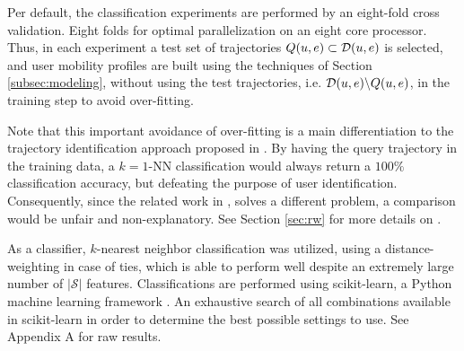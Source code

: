 Per default, the classification experiments are performed by an eight-fold cross validation. Eight folds for optimal parallelization on an eight core processor. Thus, in each experiment a test set of trajectories $Q(u,e) \subset \mathcal{D}(u,e)$ is selected, and user mobility profiles are built using the techniques of Section \ref{subsec:modeling}, without using the test trajectories, i.e. $\mathcal{D}(u,e) \backslash Q(u,e)$, in the training step to avoid over-fitting.

Note that this important avoidance of over-fitting is a main differentiation to the trajectory identification approach proposed in \citeauthor{DeMontjoye2013} \cite{DeMontjoye2013}. By having the query trajectory in the training data, a $k=1$-NN classification would always return a $100\%$ classification accuracy, but defeating the purpose of user identification. Consequently, since the related work in \citeauthor{DeMontjoye2013}, solves a different problem, a comparison would be unfair and non-explanatory. See Section \ref{sec:rw} for more details on \citeauthor{DeMontjoye2013}.

As a classifier, $k$-nearest neighbor classification was utilized, using a distance-weighting in case of ties, which is able to perform well despite an extremely large number of $|\mathcal{S}|$ features. Classifications are performed using scikit-learn, a Python machine learning framework \cite{scikit-learn}. An exhaustive search of all combinations available in scikit-learn in order to determine the best possible settings to use. See Appendix A for raw results.

